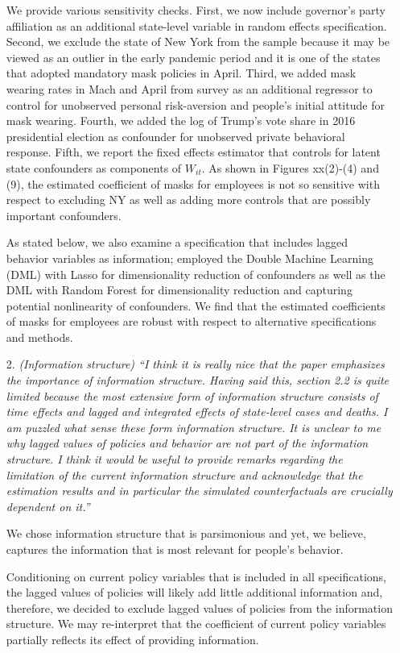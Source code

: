\documentclass[11pt]{article}
\begin{document}
\begin{itemize}
We provide various sensitivity checks. First, we now include governor's party affiliation as an additional state-level variable in random effects specification. 
Second, we exclude the state of New York from the sample because it may be viewed as an
outlier in the early pandemic period and it is  one of the states that adopted mandatory mask policies in April. Third, we added mask wearing rates in Mach and April from survey as an additional regressor to control for unobserved personal risk-aversion and people's initial attitude for mask wearing. Fourth,  we added the log of Trump's vote share in 2016 presidential election as confounder for
unobserved private behavioral response. Fifth, we report the fixed effects estimator that controls for latent state confounders as components of $W_{it}$.  
As shown in Figures xx(2)-(4) and (9), the estimated coefficient of masks for employees is not so sensitive with respect to excluding NY as well as adding more controls that are possibly important confounders.  

As stated below, we also examine a specification that includes lagged behavior variables as information; employed the Double Machine Learning (DML) with Lasso for dimensionality reduction of confounders as well as the DML with Random Forest for dimensionality reduction and capturing potential nonlinearity of confounders. We find that the estimated coefficients of masks for employees are robust with respect to alternative specifications and methods.
  
  
\item[2. ]  \textit{(Information structure) ``I think it is really nice that the paper emphasizes the importance of
information structure. Having said this, section 2.2 is quite limited because the most extensive
form of information structure consists of time effects and lagged and integrated effects
of state-level cases and deaths. I am puzzled what sense these form information structure. It
is unclear to me why lagged values of policies and behavior are not part of the information 
structure. I think it would be useful to provide remarks regarding the limitation of the current
information structure and acknowledge that the estimation results and in particular the
simulated counterfactuals are crucially dependent on it.''}
  
We chose information structure that is parsimonious and yet, we believe, captures the  information that is most relevant for people's behavior. 

Conditioning on current policy variables that is included in all specifications, the lagged values of policies will  likely add little additional information and, therefore, we decided to exclude lagged values of policies from the information structure. We may re-interpret that the coefficient of current policy variables partially reflects its effect of providing information. 


\end{itemize}
\end{document}
